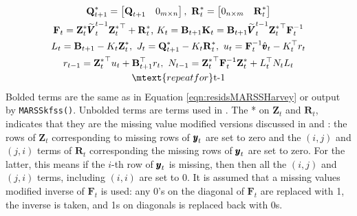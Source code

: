 \documentclass[]{article}
\def\UPS{\mbox{\boldmath $\Upsilon$}}
\def\XI{\mbox{\boldmath $\Xi$}}
\def\BB{\mbox{$\mathbf B$}}	\def\bb{\mbox{$\mathbf b$}} \def\Bb{\mbox{$\mathbf J$}} \def\Ba{\mbox{$\mathbf L$}} \def\Bm{\UPS}
\def\FF{\mbox{$\mathbf F$}} \def\ff{\mbox{$\mathbf f$}}
\def\GG{\mbox{$\mathbf G$}}	\def\gg{\mbox{$\mathbf g$}}
\def\HH{\mbox{$\mathbf H$}}	\def\hh{\mbox{$\mathbf h$}}
\def\KK{\mbox{$\mathbf K$}}
\def\QQ{\mbox{$\mathbf Q$}}	 \def\qq{\mbox{$\mathbf q$}} \def\Qb{\mbox{$\mathbf G$}}  \def\Qm{\mathbb{Q}}
\def\RR{\mbox{$\mathbf R$}}	 \def\rr{\mbox{$\mathbf r$}} \def\Rb{\mbox{$\mathbf H$}}	\def\Rm{\mathbb{R}}
\def\VV{\mbox{$\pmb{V}$}}	\def\vv{\mbox{$\pmb{v}$}}
\def\ZZ{\mbox{$\mathbf Z$}}	\def\zz{\mbox{$\mathbf z$}}	\def\Zb{\mbox{$\mathbf M$}} \def\Za{\mbox{$\mathbf N$}} \def\Zm{\XI}
\def\hatVt{\widetilde{\VV}_t}
\begin{document}

\begin{equation}\label{eqn:Harveyalgo}
\begin{gathered}
\QQ^*_{t+1}=\begin{bmatrix}\QQ_{t+1}&0_{m \times n}\end{bmatrix}, \mbox{    } \RR^*_t=\begin{bmatrix}0_{n \times m}&\RR_t^*\end{bmatrix}\\
\FF_t = \ZZ_t^*\widetilde{\VV}_t^{t-1}{\ZZ_t^*}^\top+\RR_t^*\mbox{,   } K_t = \BB_{t+1}\KK_t = \BB_{t+1} \widetilde{\VV}_t^{t-1}{\ZZ_t^*}^\top \FF_t^{-1}  \\
L_t = \BB_{t+1} - K_t\ZZ_t^*, \mbox{    } J_t= \QQ^*_{t+1} - K_t \RR^*_t, \mbox{    } u_t = \FF_t^{-1} \hat{\vv}_t - K_t^\top r_t\\
r_{t-1} = {\ZZ_t^*}^\top u_t + \BB_{t+1}^\top r_t, \mbox{    } N_{t-1} = {\ZZ_t^*}^\top \FF_t^{-1} \ZZ_t^* + L_t^\top N_t L_t \\
\mtext{repeat for }$t-1$
\end{gathered}
\end{equation}
Bolded terms are the same as in Equation \ref{eqn:residsMARSSHarvey} or output by \texttt{MARSSkfss()}.  Unbolded terms are terms used in \citet{Harveyetal1998}.  The * on $\ZZ_t$ and $\RR_t$, indicates that they are the missing value modified versions  discussed in \citet[section 6.4]{ShumwayStoffer2006} and \citet{Holmes2012}: the rows of $\ZZ_t$ corresponding to missing rows of $\mbox{$\pmb{y}$}_t$ are set to zero and the $(i,j)$ and $(j,i)$ terms of $\RR_t$ corresponding the missing rows of $\mbox{$\pmb{y}$}_t$ are set to zero.  For the latter, this means if the $i$-th row of $\mbox{$\pmb{y}$}_t$ is missing, then then all the $(i,j)$ and $(j,i)$ terms, including $(i,i)$ are set to 0. It is assumed that a missing values modified inverse of $\FF_t$ is used: any 0's on the diagonal of $\FF_t$ are replaced with 1, the inverse is taken, and 1s on diagonals is replaced back with 0s.
\end{document}
